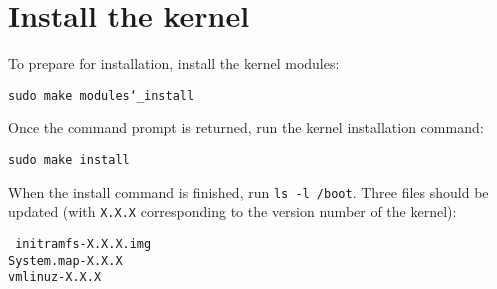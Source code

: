 \documentclass[12pt,a4paper]{report}
\begin{document}
\section{Install the kernel}
To prepare for installation, install the kernel modules:
\newline
\newline
\centerline{\texttt{sudo make modules\char`_install}}
\newline
\newline 
Once the command prompt is returned, run the kernel installation command:
\newline
\newline
\centerline{\texttt{sudo make install}}
\newline
\newline 
When the install command is finished, run \texttt{ls -l /boot}. Three files should be updated (with \texttt{X.X.X} corresponding to the version number of the kernel):
\newline
\newline
\centerline{\texttt{
initramfs-X.X.X.img
\\
System.map-X.X.X
\\
vmlinuz-X.X.X
}}
\newline
\newline
\end{document}
